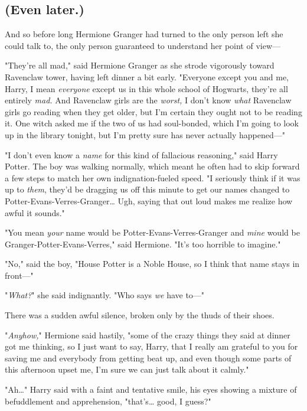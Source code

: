 \subsection{(Even later.)}

And so before long Hermione Granger had turned to the only person left she
could talk to, the only person guaranteed to understand her point of view---

"They're all mad," said Hermione Granger as she strode vigorously toward
Ravenclaw tower, having left dinner a bit early. "Everyone except you and me,
Harry, I mean \emph{everyone} except us in this whole school of Hogwarts,
they're all entirely \emph{mad.} And Ravenclaw girls are the \emph{worst,} I
don't know \emph{what} Ravenclaw girls go reading when they get older, but I'm
certain they ought not to be reading it. One witch asked me if the two of us
had soul-bonded, which I'm going to look up in the library tonight, but I'm
pretty sure has never actually happened---"

"I don't even know a \emph{name} for this kind of fallacious reasoning," said
Harry Potter. The boy was walking normally, which meant he often had to skip
forward a few steps to match her own indignation-fueled speed. "I seriously
think if it was up to \emph{them}, they'd be dragging us off this minute to get
our names changed to Potter-Evans-Verres-Granger{\ldots} Ugh, saying that out
loud makes me realize how awful it sounds."

"You mean \emph{your} name would be Potter-Evans-Verres-Granger and \emph{mine}
would be Granger-Potter-Evans-Verres," said Hermione. "It's too horrible to
imagine."

"No," said the boy, "House Potter is a Noble House, so I think that name stays
in front---"

"\emph{What?}" she said indignantly. "Who says \emph{we} have to---"

There was a sudden awful silence, broken only by the thuds of their shoes.

"\emph{Anyhow,}" Hermione said hastily, "some of the crazy things they said at
dinner got me thinking, so I just want to say, Harry, that I really am grateful
to you for saving me and everybody from getting beat up, and even though some
parts of this afternoon upset me, I'm sure we can just talk about it calmly."

"Ah{\ldots}" Harry said with a faint and tentative smile, his eyes showing a
mixture of befuddlement and apprehension, "that's{\ldots} good, I guess?"

